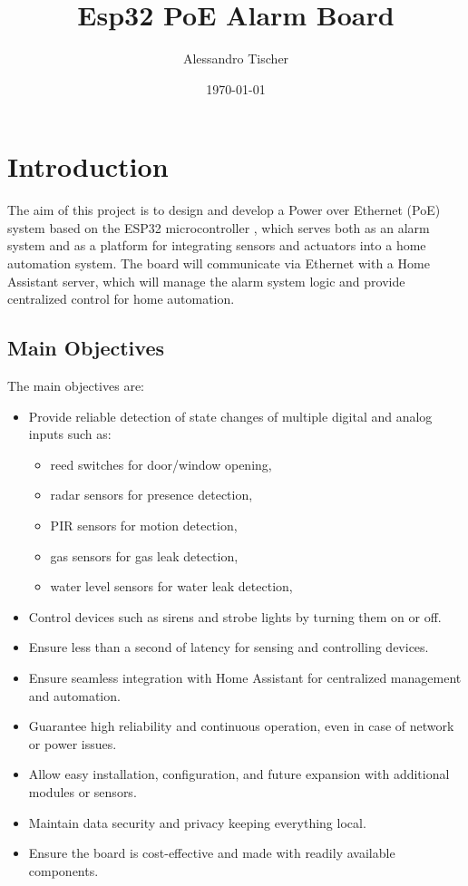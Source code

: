 \documentclass[a4paper,12pt]{article}
\title{Esp32 PoE Alarm Board}
\author{Alessandro Tischer}
\date{\today}
\begin{document}
\maketitle

\newpage
\tableofcontents
\newpage


\section{Introduction}
The aim of this project is to design and develop a Power over Ethernet (PoE) system based on the ESP32 microcontroller \cite{ESP32WiFiBluetooth}, which serves both as an alarm system and as a platform for integrating sensors and actuators into a home automation system.  
The board will communicate via Ethernet with a Home Assistant \cite{assistantHomeAssistant} server, which will manage the alarm system logic and provide centralized control for home automation.  

\subsection{Main Objectives}\label{sec:MainObjectives}
The main objectives are:
\begin{itemize}
    \item Provide reliable detection of state changes of multiple digital and analog inputs such as:
        \begin{itemize}
            \item reed switches for door/window opening,
            \item radar sensors for presence detection,
            \item PIR sensors for motion detection,
            \item gas sensors for gas leak detection,
            \item water level sensors for water leak detection,
        \end{itemize}
    \item Control devices such as sirens and strobe lights by turning them on or off.
    \item Ensure less than a second of latency for sensing and controlling devices. 
    \item Ensure seamless integration with Home Assistant for centralized management and automation.
    \item Guarantee high reliability and continuous operation, even in case of network or power issues.
    \item Allow easy installation, configuration, and future expansion with additional modules or sensors.
    \item Maintain data security and privacy keeping everything local.
    \item Ensure the board is cost-effective and made with readily available components.
\end{itemize}
\end{document}
